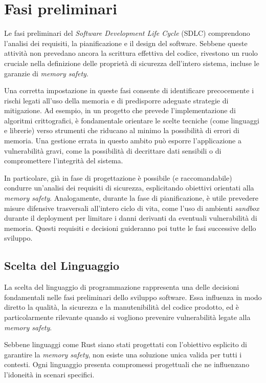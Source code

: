 \section{Fasi preliminari}
\label{sec:preliminary_stages}

Le fasi preliminari del \textit{Software Development Life Cycle} (SDLC)
comprendono l'analisi dei requisiti, la pianificazione e il design del software.
Sebbene queste attività non prevedano ancora la scrittura effettiva del codice, rivestono
un ruolo cruciale nella definizione delle proprietà di sicurezza dell'intero sistema,
incluse le garanzie di \textit{memory safety}.

Una corretta impostazione in queste fasi consente di identificare precocemente i
rischi legati all'uso della memoria e di predisporre adeguate strategie di mitigazione.
Ad esempio, in un progetto che prevede l'implementazione di algoritmi crittografici,
è fondamentale orientare le scelte tecniche (come linguaggi e librerie) verso
strumenti che riducano al minimo la possibilità di errori di memoria. Una gestione
errata in questo ambito può esporre l'applicazione a vulnerabilità gravi, come
la possibilità di decrittare dati sensibili o di compromettere l'integrità del
sistema.

In particolare, già in fase di progettazione è possibile (e raccomandabile) condurre
un'analisi dei requisiti di sicurezza, esplicitando obiettivi orientati alla
\textit{memory safety}. Analogamente, durante la fase di pianificazione, è utile
prevedere misure difensive trasversali all'intero ciclo di vita, come l'uso di ambienti
\textit{sandbox} durante il deployment per limitare i danni derivanti da
eventuali vulnerabilità di memoria. Questi requisiti e decisioni guideranno poi tutte
le fasi successive dello sviluppo.

\subsection{Scelta del Linguaggio}
\label{sec:linguaggio}

La scelta del linguaggio di programmazione rappresenta una delle decisioni
fondamentali nelle fasi preliminari dello sviluppo software. Essa influenza in modo
diretto la qualità, la sicurezza e la manutenibilità del codice prodotto, ed è particolarmente
rilevante quando si vogliono prevenire vulnerabilità legate alla \textit{memory
safety}.

Sebbene linguaggi come Rust siano stati progettati con l'obiettivo esplicito di
garantire la \textit{memory safety}, non esiste una soluzione unica valida per
tutti i contesti. Ogni linguaggio presenta compromessi progettuali che ne influenzano
l'idoneità in scenari specifici.

